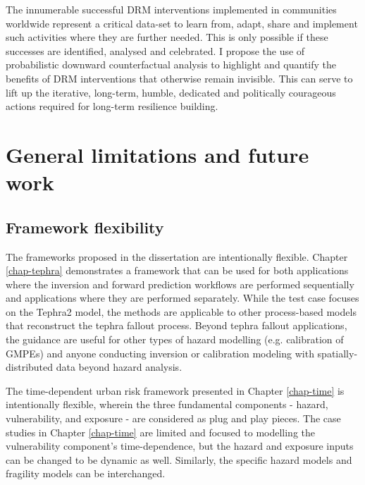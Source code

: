 The innumerable successful DRM interventions implemented in communities worldwide represent a critical data-set to learn from, adapt, share and implement such activities where they are further needed. This is only possible if these successes are identified, analysed and celebrated. I propose the use of probabilistic downward counterfactual analysis to highlight and quantify the benefits of DRM interventions that otherwise remain invisible. This can serve to lift up the iterative, long-term, humble, dedicated and politically courageous actions required for long-term resilience building. 


\section{General limitations and future work}

\subsection{Framework flexibility}

    The frameworks proposed in the dissertation are intentionally flexible. Chapter \ref{chap-tephra} demonstrates a framework that can be used for both applications where the inversion and forward prediction workflows are performed sequentially and applications where they are performed separately. While the test case focuses on the Tephra2 model, the methods are applicable to other process-based models that reconstruct the tephra fallout process. Beyond tephra fallout applications, the guidance are useful for other types of hazard modelling (e.g. calibration of GMPEs) and anyone conducting inversion or calibration modeling with spatially-distributed data beyond hazard analysis. 

    The time-dependent urban risk framework presented in Chapter \ref{chap-time} is intentionally flexible, wherein the three fundamental components - hazard, vulnerability, and exposure - are considered as plug and play pieces. The case studies in Chapter \ref{chap-time} are limited and focused to modelling the vulnerability component's time-dependence, but the hazard and exposure inputs can be changed to be dynamic as well. Similarly, the specific hazard models and fragility models can be interchanged. 
    
